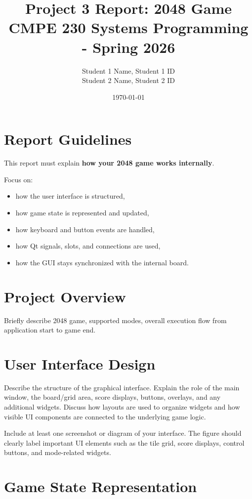 \documentclass[a4paper,12pt]{article}
\title{Project 3 Report: 2048 Game\\
\large CMPE 230 Systems Programming - Spring 2026}
\author{
Student 1 Name, Student 1 ID \\
Student 2 Name, Student 2 ID
}
\date{\today}
\begin{document}
\maketitle

\section*{Report Guidelines}

This report must explain \textbf{how your 2048 game works internally}.

Focus on:
\begin{itemize}
    \item how the user interface is structured,
    \item how game state is represented and updated,
    \item how keyboard and button events are handled,
    \item how Qt signals, slots, and connections are used,
    \item how the GUI stays synchronized with the internal board.
\end{itemize}

\section{Project Overview}

Briefly describe 2048 game, supported modes, overall execution flow from application start to game end.

\section{User Interface Design}

Describe the structure of the graphical interface. Explain the role of the main window, the board/grid area, score displays, buttons, overlays, and any additional widgets. Discuss how layouts are used to organize widgets and how visible UI components are connected to the underlying game logic.

Include at least one screenshot or diagram of your interface. The figure should clearly label important UI elements such as the tile grid, score displays, control buttons, and mode-related widgets.

\section{Game State Representation}
\end{document}
